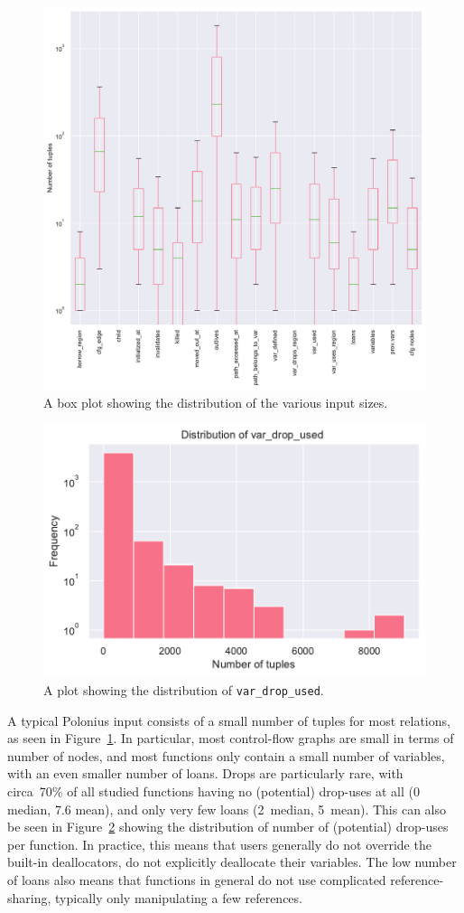 \documentclass[11pt,a4paper,twoside,openany]{report}
\newcommand{\InDatalog}[1]{\texttt{#1}}
\begin{document}
\begin{figure}
  \includegraphics[width=0.9\linewidth]{Graphs/input_sizes_boxplot.pdf}
  \caption[Distribution of Polonius Input Tuple Sizes]{A box plot showing the
    distribution of the various input sizes.}
  \label{fig:input-sizes}
\end{figure}

\begin{figure}
  \includegraphics[width=0.5\linewidth]{Graphs/var_drop_used_size_dist.pdf}
  \caption[Distribution of Input Sizes for the \InDatalog{var_drop_used} Fact]{A
    plot showing the distribution of \InDatalog{var_drop_used}.}
  \label{fig:input-var-drop-used}
\end{figure}

A typical Polonius input consists of a small number of tuples for most
relations, as seen in Figure~\ref{fig:input-sizes}. In particular, most
control-flow graphs are small in terms of number of nodes, and most functions
only contain a small number of variables, with an even smaller number of loans.
Drops are particularly rare, with circa~70\% of all studied functions having
no (potential) drop-uses at all (0 median, 7.6 mean), and only very few
loans (2~median, 5~mean). This can also be seen in
Figure~\ref{fig:input-var-drop-used} showing the distribution of number of
(potential) drop-uses per function. In practice, this means that users generally
do not override the built-in deallocators, do not explicitly deallocate their
variables. The low number of loans also means that functions in general do not
use complicated reference-sharing, typically only manipulating a few references.
\end{document}
